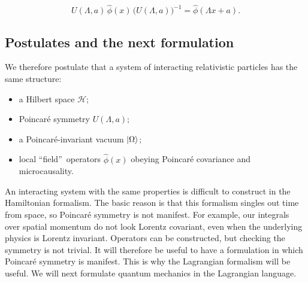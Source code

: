 \begin{equation}
  U(\Lambda,a)\,\hat\phi(x)\,\bigl(U(\Lambda,a)\bigr)^{-1}
  =\hat\phi(\Lambda x+a).
  \label{eq:253a-free-field-covariance}
\end{equation}

\subsection{Postulates and the next formulation}
\label{sec:253a-postulates}

We therefore postulate that a system of interacting relativistic particles has
the same structure:
\begin{itemize}
  \setlength{\itemsep}{2pt}
  \setlength{\parsep}{0pt}
  \setlength{\topsep}{3pt}
  \item a Hilbert space $\mathcal H$;
  \item Poincar\'e symmetry $U(\Lambda,a)$;
  \item a Poincar\'e-invariant vacuum $\lvert \Omega\rangle$;
  \item local \textquotedblleft field\textquotedblright\ operators
    $\hat\phi(x)$ obeying Poincar\'e covariance and microcausality.
\end{itemize}

An interacting system with the same properties is difficult to construct in the
Hamiltonian formalism. The basic reason is that this formalism singles out time
from space, so Poincaré symmetry is not manifest.
For example, our integrals over spatial momentum do not look Lorentz covariant,
even when the underlying physics is Lorentz invariant. Operators can be
constructed, but checking the symmetry is not trivial.
It will therefore be useful to have a formulation in which Poincaré symmetry is
manifest. This is why the Lagrangian formalism will be useful. We will next
formulate quantum mechanics in the Lagrangian language.

